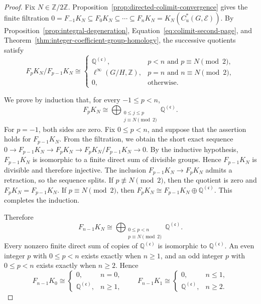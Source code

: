 \documentclass[pdflatex,sn-mathphys-num]{sn-jnl}%
\theoremstyle{plain}
\theoremstyle{remark}
\theoremstyle{definition}
\numberwithin{equation}{section}
\begin{document}
\begin{proof}
Fix \( N\in\mathbb Z/2\mathbb Z \). Proposition~\ref{prop:directed-colimit-convergence} gives the finite filtration \( 0=F_{-1}K_N\subseteq F_0K_N\subseteq\cdots\subseteq F_nK_N=K_N(C_u^*(G,\mathcal E)) \). By Proposition~\ref{prop:integral-degeneration}, Equation~\eqref{eq:colimit-second-page}, and Theorem~\ref{thm:integer-coefficient-group-homology}, the successive quotients satisfy
\[
F_pK_N/F_{p-1}K_N
\cong
\begin{cases}
\mathbb Q^{(\mathfrak c)},
& p<n \text{ and } p\equiv N\pmod 2,\\
\ell^\infty(G/H,\mathbb Z),
& p=n \text{ and } n\equiv N\pmod 2,\\
0,
& \text{otherwise}.
\end{cases}
\]

We prove by induction that, for every \( -1\leq p<n \),
\[
F_pK_N
\cong
\bigoplus_{\substack{0\leq j\leq p\\j\equiv N\pmod 2}}
\mathbb Q^{(\mathfrak c)}.
\]
For \( p=-1 \), both sides are zero. Fix \( 0\leq p<n \), and suppose that the assertion holds for \( F_{p-1}K_N \). From the filtration, we obtain the short exact sequence \( 0\to F_{p-1}K_N\to F_pK_N\to F_pK_N/F_{p-1}K_N\to0 \). By the inductive hypothesis, \( F_{p-1}K_N \) is isomorphic to a finite direct sum of divisible groups. Hence \( F_{p-1}K_N \) is divisible and therefore injective. The inclusion \( F_{p-1}K_N\to F_pK_N \) admits a retraction, so the sequence splits. If \( p\not\equiv N\pmod 2 \), then the quotient is zero and \( F_pK_N=F_{p-1}K_N \). If \( p\equiv N\pmod 2 \), then \( F_pK_N\cong F_{p-1}K_N\oplus\mathbb Q^{(\mathfrak c)} \). This completes the induction.

Therefore
\[
F_{n-1}K_N
\cong
\bigoplus_{\substack{0\leq p<n\\p\equiv N\pmod 2}}
\mathbb Q^{(\mathfrak c)}.
\]
Every nonzero finite direct sum of copies of \( \mathbb Q^{(\mathfrak c)} \) is isomorphic to \( \mathbb Q^{(\mathfrak c)} \). An even integer \( p \) with \( 0\leq p<n \) exists exactly when \( n\geq1 \), and an odd integer \( p \) with \( 0\leq p<n \) exists exactly when \( n\geq2 \). Hence
\[
F_{n-1}K_0
\cong
\begin{cases}
0,
& n=0,\\
\mathbb Q^{(\mathfrak c)},
& n\geq1,
\end{cases}
\qquad
F_{n-1}K_1
\cong
\begin{cases}
0,
& n\leq1,\\
\mathbb Q^{(\mathfrak c)},
& n\geq2.
\end{cases}
\]


\end{proof}
\end{document}
